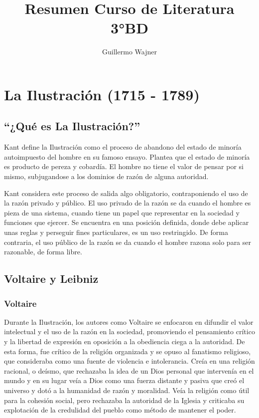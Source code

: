\documentclass{article}
\title{Resumen Curso de Literatura 3°BD}
\author{Guillermo Wajner}
\begin{document}
\maketitle

\section{La Ilustración (1715 - 1789)}

\subsection{``¿Qué es La Ilustración?''}

Kant define la Ilustración como el proceso de abandono del estado de minoría autoimpuesto del hombre en su famoso ensayo. Plantea que el estado de minoría es producto de pereza y cobardía. El hombre no tiene el valor de pensar por si mismo, subjugandose a los dominios de razón de alguna autoridad.

Kant considera este proceso de salida algo obligatorio, contraponiendo el uso de la razón privado y público. El uso privado de la razón se da cuando el hombre es pieza de una sistema, cuando tiene un papel que representar en la sociedad y funciones que ejercer. Se encuentra en una posición definida, donde debe aplicar unas reglas y perseguir fines particulares, es un uso restringido. De forma contraria, el uso público de la razón se da cuando el hombre razona solo para ser razonable, de forma libre.

\subsection{Voltaire y Leibniz}

\subsubsection*{Voltaire}

Durante la Ilustración, los autores como Voltaire se enfocaron en difundir el valor intelectual y el uso de la razón en la sociedad, promoviendo el pensamiento crítico y la libertad de expresión en oposición a la obediencia ciega a la autoridad. De esta forma, fue crítico de la religión organizada y se opuso al fanatismo religioso, que consideraba como una fuente de violencia e intolerancia. Creía en una religión racional, o deísmo, que rechazaba la idea de un Dios personal que intervenía en el mundo y en su lugar veía a Dios como una fuerza distante y pasiva que creó el universo y dotó a la humanidad de razón y moralidad. Veía la religión como útil para la cohesión social, pero rechazaba la autoridad de la Iglesia y criticaba su explotación de la credulidad del pueblo como método de mantener el poder.
\end{document}

